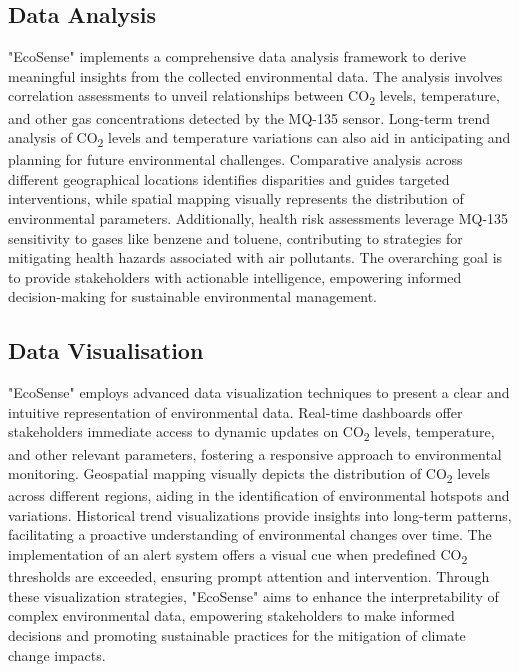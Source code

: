 \documentclass[conference]{IEEEtran}
\begin{document}
\subsection{Data Analysis}

"EcoSense" implements a comprehensive data analysis framework to derive meaningful insights from the collected environmental data. The analysis involves correlation assessments to unveil relationships between CO\textsubscript{2} levels, temperature, and other gas concentrations detected by the MQ-135 sensor. Long-term trend analysis of CO\textsubscript{2} levels and temperature variations can also aid in anticipating and planning for future environmental challenges. Comparative analysis across different geographical locations identifies disparities and guides targeted interventions, while spatial mapping visually represents the distribution of environmental parameters. Additionally, health risk assessments leverage MQ-135 sensitivity to gases like benzene and toluene, contributing to strategies for mitigating health hazards associated with air pollutants. The overarching goal is to provide stakeholders with actionable intelligence, empowering informed decision-making for sustainable environmental management.

\subsection{Data Visualisation}

"EcoSense" employs advanced data visualization techniques to present a clear and intuitive representation of environmental data. Real-time dashboards offer stakeholders immediate access to dynamic updates on CO\textsubscript{2} levels, temperature, and other relevant parameters, fostering a responsive approach to environmental monitoring. Geospatial mapping visually depicts the distribution of CO\textsubscript{2} levels across different regions, aiding in the identification of environmental hotspots and variations. Historical trend visualizations provide insights into long-term patterns, facilitating a proactive understanding of environmental changes over time. The implementation of an alert system offers a visual cue when predefined CO\textsubscript{2} thresholds are exceeded, ensuring prompt attention and intervention. Through these visualization strategies, "EcoSense" aims to enhance the interpretability of complex environmental data, empowering stakeholders to make informed decisions and promoting sustainable practices for the mitigation of climate change impacts.
\end{document}
